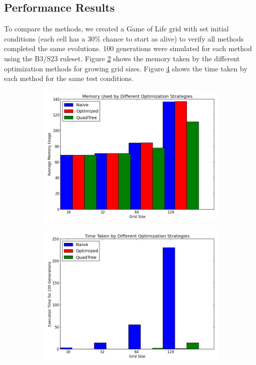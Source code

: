\documentclass[11pt]{article}
\begin{document}
\subsection{Performance Results}
To compare the methods, we created a Game of Life grid with set initial conditions (each cell has a 30\% chance to start as alive) to verify all methods completed the same evolutions.  100 generations were simulated for each method using the B3/S23 ruleset.  Figure \ref{fig:avg_mem_use} shows the memory taken by the different optimization methods for growing grid sizes.  Figure \ref{fig:avg_time_use} shows the time taken by each method for the same test conditions.
\begin{figure}[!ht]
	\centering
	\begin{subfigure}{\textwidth}
		\centering
  	  	\includegraphics[width=1\linewidth]{images/average_random.png}
  	  	\label{fig:avg_mem}
	\end{subfigure}
	\label{fig:avg_mem_use}
\end{figure}
\begin{figure}[!ht]
	\centering
	\begin{subfigure}{\textwidth}
		\centering
  	  	\includegraphics[width=1\linewidth]{images/time_random.png}
  	  	\label{fig:avg_time}
	\end{subfigure}
	\label{fig:avg_time_use}
\end{figure}
\end{document}
